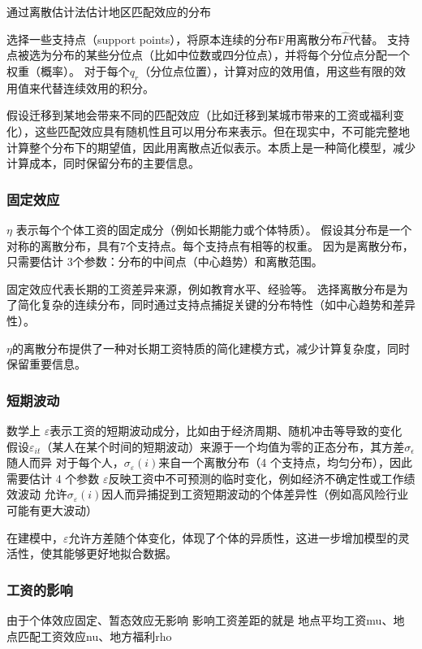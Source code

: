 \documentclass[a4paper,12pt]{article}
\begin{document}
通过离散估计法估计地区匹配效应的分布

选择一些支持点（support points），将原本连续的分布F用离散分布$\hat F$代替。
支持点被选为分布的某些分位点（比如中位数或四分位点），并将每个分位点分配一个权重（概率）。
对于每个$q_r$（分位点位置），计算对应的效用值，用这些有限的效用值来代替连续效用的积分。

假设迁移到某地会带来不同的匹配效应（比如迁移到某城市带来的工资或福利变化），这些匹配效应具有随机性且可以用分布来表示。但在现实中，不可能完整地计算整个分布下的期望值，因此用离散点近似表示。本质上是一种简化模型，减少计算成本，同时保留分布的主要信息。

\subsubsection{固定效应}


$\eta$ 表示每个个体工资的固定成分（例如长期能力或个体特质）。
假设其分布是一个对称的离散分布，具有7个支持点。每个支持点有相等的权重。
因为是离散分布，只需要估计 3个参数：分布的中间点（中心趋势）和离散范围。

固定效应代表长期的工资差异来源，例如教育水平、经验等。
选择离散分布是为了简化复杂的连续分布，同时通过支持点捕捉关键的分布特性（如中心趋势和差异性）。

$\eta$的离散分布提供了一种对长期工资特质的简化建模方式，减少计算复杂度，同时保留重要信息。

\subsubsection{短期波动}

数学上
$\varepsilon$表示工资的短期波动成分，比如由于经济周期、随机冲击等导致的变化
假设$\varepsilon_{it}$（某人在某个时间的短期波动）来源于一个均值为零的正态分布，其方差$\sigma_{\epsilon}$随人而异
对于每个人，$\sigma_\varepsilon(i)$来自一个离散分布（4 个支持点，均匀分布），因此需要估计 4 个参数
$\varepsilon$反映工资中不可预测的临时变化，例如经济不确定性或工作绩效波动
允许$\sigma_\varepsilon(i)$因人而异捕捉到工资短期波动的个体差异性（例如高风险行业可能有更大波动）


在建模中，$\varepsilon$允许方差随个体变化，体现了个体的异质性，这进一步增加模型的灵活性，使其能够更好地拟合数据。

\subsubsection{工资的影响}

由于个体效应固定、暂态效应无影响
影响工资差距的就是
地点平均工资mu、地点匹配工资效应nu、地方福利rho
\end{document}
